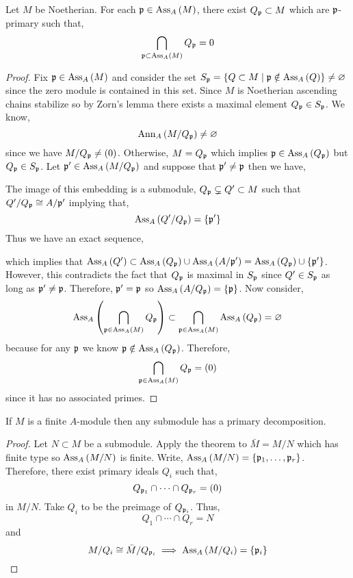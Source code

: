 \documentclass[12pt]{article}
\begin{document}
\begin{theorem}
Let $M$ be Noetherian. For each $\mathfrak{p} \in \mathrm{Ass}_{A}\left( M \right)$, there exist $Q_{\mathfrak{p}} \subset M$ which are $\mathfrak{p}$-primary such that,
\[ \bigcap_{\mathfrak{p} \subset \mathrm{Ass}_{A}\left( M \right)} Q_{\mathfrak{p}} = 0 \]
\end{theorem}

\begin{proof}
Fix $\mathfrak{p} \in \mathrm{Ass}_{A}\left( M \right)$ and consider the set $S_{\mathfrak{p}} = \{ Q \subset M \mid \mathfrak{p} \notin \mathrm{Ass}_{A}\left( Q \right) \} \neq \varnothing$ since the zero module is contained in this set. Since $M$ is Noetherian ascending chains stabilize so by Zorn's lemma there exists a maximal element $Q_{\mathfrak{p}} \in S_{\mathfrak{p}}$. We know,
\[ \mathrm{Ann}_{A}\left(M / Q_{\mathfrak{p}}\right)  \neq \varnothing \]
since we have $M / Q_{\mathfrak{p}} \neq (0)$. Otherwise, $M = Q_{\mathfrak{p}}$ which implies $\mathfrak{p} \in \mathrm{Ass}_{A}\left( Q_{\mathfrak{p}} \right)$ but $Q_{\mathfrak{p}} \in S_{\mathfrak{p}}$. Let $\mathfrak{p}' \in \mathrm{Ass}_{A}\left( M / Q_{\mathfrak{p}} \right)$ and suppose that $\mathfrak{p}' \neq \mathfrak{p}$ then we have,
\begin{center}
\end{center}    
The image of this embedding is a submodule, $Q_{\mathfrak{p}} \subsetneq Q' \subset M$ such that $Q' / Q_{\mathfrak{p}} \cong A / \mathfrak{p}'$ implying that,
\[ \mathrm{Ass}_{A}\left( Q' / Q_{\mathfrak{p}} \right) = \{ \mathfrak{p}' \} \]
Thus we have an exact sequence,
\begin{center}
\end{center}
which implies that $\mathrm{Ass}_{A}\left( Q' \right) \subset \mathrm{Ass}_{A}\left( Q_{\mathfrak{p}} \right) \cup \mathrm{Ass}_{A}\left( A / \mathfrak{p}' \right) =  \mathrm{Ass}_{A}\left( Q_{\mathfrak{p}} \right) \cup \{ \mathfrak{p}' \}$.
However, this contradicts the fact that $Q_{\mathfrak{p}}$ is maximal in $S_{\mathfrak{p}}$ since $Q' \in S_{\mathfrak{p}}$ as long as $\mathfrak{p}' \neq \mathfrak{p}$. Therefore, $\mathfrak{p}' = \mathfrak{p}$ so $\mathrm{Ass}_{A}\left( A / Q_{\mathfrak{p}} \right) = \{ \mathfrak{p} \}$. Now consider,
\[ \mathrm{Ass}_{A}\left( \bigcap_{\mathfrak{p} \in \mathrm{Ass}_{A}\left( M \right)} Q_{\mathfrak{p}} \right) \subset \bigcap_{\mathfrak{p} \in \mathrm{Ass}_{A}\left( M \right)} \mathrm{Ass}_{A}\left( Q_{\mathfrak{p}} \right) = \varnothing \]
because for any $\mathfrak{p}$ we know $\mathfrak{p} \notin \mathrm{Ass}_{A}\left( Q_{\mathfrak{p}} \right)$. Therefore,
\[ \bigcap_{\mathfrak{p} \in \mathrm{Ass}_{A}\left( M \right)} Q_{\mathfrak{p}} = (0) \]
since it has no associated primes. 
\end{proof}

\begin{corollary}
If $M$ is a finite $A$-module then any submodule has a primary decomposition. 
\end{corollary}

\begin{proof}
Let $N \subset M$ be a submodule. 
Apply the theorem to $\bar{M} = M / N$ which has finite type so $\mathrm{Ass}_{A}\left( M / N \right)$ is finite. Write, $\mathrm{Ass}_{A}\left( M / N \right) = \{ \mathfrak{p}_1, \dots, \mathfrak{p}_r \}$. Therefore, there exist primary ideals $Q_i$ such that,
\[ Q_{\mathfrak{p}_1} \cap \cdots \cap Q_{\mathfrak{p}_r} = (0) \]
in $M / N$. Take $Q_i$ to be the preimage of $Q_{\mathfrak{p}_i}$. Thus,
\[ Q_1 \cap \cdots \cap Q_r = N \]
and 
\[ M / Q_i \cong \bar{M} / Q_{\mathfrak{p}_i} \implies \mathrm{Ass}_{A}\left( M / Q_i \right) = \{ \mathfrak{p}_i \} \]
\end{proof}
\end{document}
